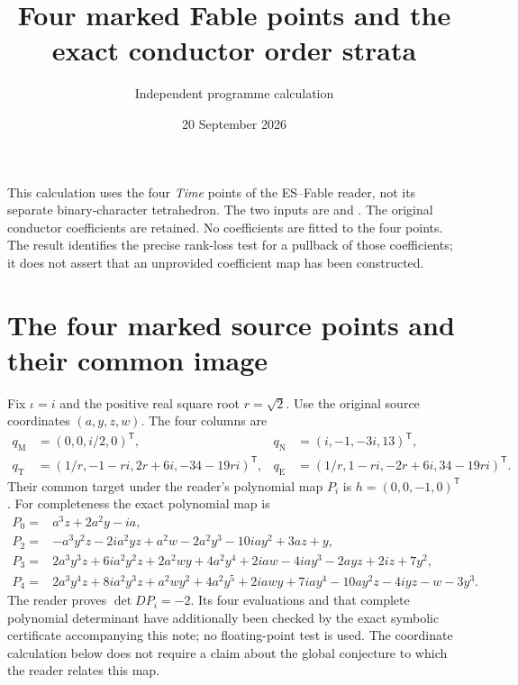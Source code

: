 \documentclass[11pt]{article}
\title{Four marked Fable points and the exact conductor order strata}
\author{Independent programme calculation}
\date{20 September 2026}
\begin{document}
\maketitle

This calculation uses the four \emph{Time} points of the ES--Fable reader,
not its separate binary-character tetrahedron. The two inputs are
\cite[Theorem \texttt{explicit-four-time-Jacobian-collision}]{ES}
and \cite[WCF1--6 and WCF19a]{WCF}. The original conductor coefficients
are retained. No coefficients are fitted to the four points. The result
identifies the precise rank-loss test for a pullback of those coefficients;
it does not assert that an unprovided coefficient map has been constructed.

\section{The four marked source points and their common image}
Fix $\iota=i$ and the positive real square root $r=\sqrt2$. Use the
original source coordinates $(a,y,z,w)$. The four columns are
\begin{align*}
q_{\mathrm M}&=(0,0,i/2,0)^{\mathsf T},&
q_{\mathrm N}&=(i,-1,-3i,13)^{\mathsf T},\\
q_{\mathrm T}&=(1/r,-1-ri,2r+6i,-34-19ri)^{\mathsf T},&
q_{\mathrm E}&=(1/r,1-ri,-2r+6i,34-19ri)^{\mathsf T}.
\end{align*}
Their common target under the reader's polynomial map $P_i$ is
$h=(0,0,-1,0)^{\mathsf T}$. For completeness the exact polynomial map is
\begin{align*}
P_0={}&a^3z+2a^2y-ia,\\
P_2={}&-a^3y^2z-2ia^2yz+a^2w-2a^2y^3-10iay^2+3az+y,\\
P_3={}&2a^3y^3z+6ia^2y^2z+2a^2wy+4a^2y^4+2iaw
       -4iay^3-2ayz+2iz+7y^2,\\
P_4={}&2a^3y^4z+8ia^2y^3z+a^2wy^2+4a^2y^5+2iawy
       +7iay^4-10ay^2z-4iyz-w-3y^3.
\end{align*}
The reader proves $\det DP_i=-2$. Its four evaluations and that complete
polynomial determinant have additionally been checked by the exact
symbolic certificate accompanying this note; no floating-point test is
used. The coordinate calculation below does not require a claim about
the global conjecture to which the reader relates this map.
\end{document}
